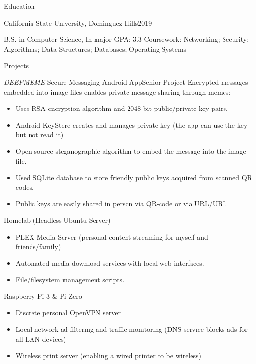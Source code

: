 \documentclass[]{mcdowellcv}
\begin{document}
	\makeheader
	
	\begin{cvsection}{Education}
		\begin{cvsubsection}{California State University, Dominguez Hills}{2019}
			
			\par B.S. in Computer Science, In-major GPA: 3.3
			\newline Coursework: Networking; Security; Algorithms; Data Structures; Databases; Operating Systems
			
		\end{cvsubsection}
	\end{cvsection}

	\begin{cvsection}{Projects}
		\begin{cvsubsection}{\emph{DEEPMEME} Secure Messaging Android App}{Senior Project}
			Encrypted messages embedded into image files enables private message sharing through memes: 
			\begin{itemize}[topsep=-3pt]
				\item Uses RSA encryption algorithm and 2048-bit public/private key pairs.
				\item Android KeyStore creates and manages private key (the app can use the key but not read it).
				\item Open source steganographic algorithm to embed the message into the image file.
				\item Used SQLite database to store friendly public keys acquired from scanned QR codes.
				\item Public keys are easily shared in person via QR-code or via URL/URI.
			\end{itemize}
		\end{cvsubsection}
		
		\begin{cvsubsection}{Homelab (Headless Ubuntu Server)}{}
			\begin{itemize}
				\item PLEX Media Server (personal content streaming for myself and friends/family)
				\item Automated media download services with local web interfaces.
				\item File/filesystem management scripts.
			\end{itemize}
		\end{cvsubsection}
		\begin{cvsubsection}{Raspberry Pi 3 \& Pi Zero}{}
			\begin{itemize}
				\item Discrete personal OpenVPN server
				\item Local-network ad-filtering and traffic monitoring (DNS service blocks ads for all LAN devices)
				\item Wireless print server (enabling a wired printer to be wireless)
			\end{itemize}
		\end{cvsubsection}
		

\end{cvsection}
\end{document}
